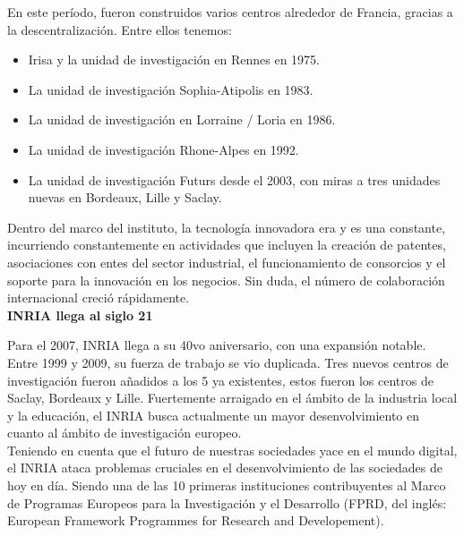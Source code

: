 En este período, fueron construidos varios centros alrededor de Francia, gracias a la descentralización. Entre ellos tenemos:

\begin{itemize}
\renewcommand\labelitemi{$\circ$}

\item Irisa y la unidad de investigación en Rennes en 1975.

\item La unidad de investigación Sophia-Atipolis en 1983.

\item La unidad de investigación en Lorraine / Loria en 1986.

\item La unidad de investigación Rhone-Alpes en 1992.

\item La unidad de investigación Futurs desde el 2003, con miras a tres unidades nuevas en Bordeaux, Lille y Saclay.

\end{itemize}

Dentro del marco del instituto, la tecnología innovadora era y es una constante, incurriendo constantemente en actividades que incluyen la creación de patentes, asociaciones con entes del sector industrial, el funcionamiento de consorcios y el soporte para la innovación en los negocios. Sin duda, el número de colaboración internacional creció rápidamente.\\

\noindent
\textbf{INRIA llega al siglo 21}

Para el 2007, INRIA llega a su 40vo aniversario, con una expansión notable. Entre 1999 y 2009, su fuerza de trabajo se vio duplicada. Tres nuevos centros de investigación fueron añadidos a los 5 ya existentes, estos fueron los centros de Saclay, Bordeaux y Lille. Fuertemente arraigado en el ámbito de la industria local y la educación, el INRIA busca actualmente un mayor desenvolvimiento en cuanto al ámbito de investigación europeo. \\

Teniendo en cuenta que el futuro de nuestras sociedades yace en el mundo digital, el INRIA ataca problemas cruciales en el desenvolvimiento de las sociedades de hoy en día. Siendo una de las 10 primeras instituciones contribuyentes al Marco de Programas Europeos para la Investigación y el Desarrollo (FPRD, del inglés: European Framework Programmes for Research and Developement). \\

